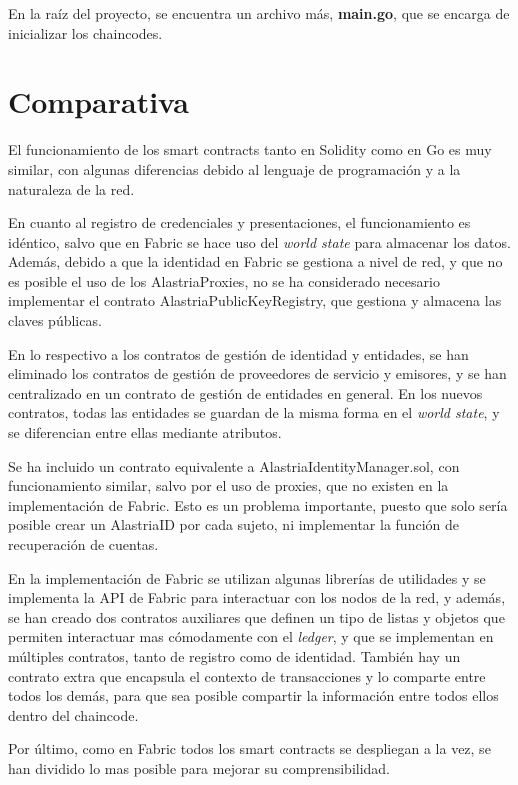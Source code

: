 En la raíz del proyecto, se encuentra un archivo más, \textbf{main.go}, que se encarga de inicializar los chaincodes.

\clearpage

\section{Comparativa}
El funcionamiento de los smart contracts tanto en Solidity como en Go es muy similar, con algunas diferencias debido al lenguaje de programación y a la naturaleza de la red.

En cuanto al registro de credenciales y presentaciones, el funcionamiento es idéntico, salvo que en Fabric se hace uso del \textit{world state} para almacenar los datos. Además, debido a que la identidad en Fabric se gestiona a nivel de red, y que no es posible el uso de los AlastriaProxies, no se ha considerado necesario implementar el contrato AlastriaPublicKeyRegistry, que gestiona y almacena las claves públicas.

En lo respectivo a los contratos de gestión de identidad y entidades, se han eliminado los contratos de gestión de proveedores de servicio y emisores, y se han centralizado en un contrato de gestión de entidades en general. En los nuevos contratos, todas las entidades se guardan de la misma forma en el \textit{world state}, y se diferencian entre ellas mediante atributos.

Se ha incluido un contrato equivalente a AlastriaIdentityManager.sol, con funcionamiento similar, salvo por el uso de proxies, que no existen en la implementación de Fabric. Esto es un problema importante, puesto que solo sería posible crear un AlastriaID por cada sujeto, ni implementar la función de recuperación de cuentas.

En la implementación de Fabric se utilizan algunas librerías de utilidades y se implementa la API de Fabric para interactuar con los nodos de la red, y además, se han creado dos contratos auxiliares que definen un tipo de listas y objetos que permiten interactuar mas cómodamente con el \textit{ledger}, y que se implementan en múltiples contratos, tanto de registro como de identidad. También hay un contrato extra que encapsula el contexto de transacciones y lo comparte entre todos los demás, para que sea posible compartir la información entre todos ellos dentro del chaincode.

Por último, como en Fabric todos los smart contracts se despliegan a la vez, se han dividido lo mas posible para mejorar su comprensibilidad.

